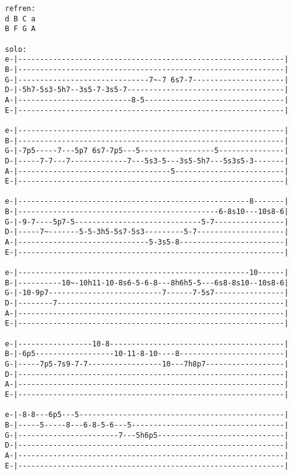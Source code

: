 \begin{verbatim}
refren:
d B C a
B F G A

solo:
e-|-------------------------------------------------------------|
B-|-------------------------------------------------------------|
G-|------------------------------7~-7 6s7-7---------------------|
D-|-5h7-5s3-5h7--3s5-7-3s5-7------------------------------------|
A-|--------------------------8-5--------------------------------|
E-|-------------------------------------------------------------|

e-|-------------------------------------------------------------|
B-|-------------------------------------------------------------|
G-|-7p5-----7---5p7 6s7-7p5---5-----------------5---------------|
D-|-----7-7---7-------------7---5s3-5---3s5-5h7---5s3s5-3-------|
A-|-----------------------------------5-------------------------|
E-|-------------------------------------------------------------|

e-|-----------------------------------------------------8-------|
B-|----------------------------------------------6-8s10---10s8-6|
G-|-9-7----5p7-5-----------------------------5-7----------------|
D-|-----7~-------5-5-3h5-5s7-5s3---------5-7--------------------|
A-|------------------------------5-3s5-8------------------------|
E-|-------------------------------------------------------------|

e-|-----------------------------------------------------10------|
B-|----------10~-10h11-10-8s6-5-6-8---8h6h5-5---6s8-8s10--10s8-6|
G-|-10-9p7--------------------------7------7-5s7----------------|
D-|--------7----------------------------------------------------|
A-|-------------------------------------------------------------|
E-|-------------------------------------------------------------|

e-|-----------------10-8----------------------------------------|
B-|-6p5------------------10-11-8-10----8------------------------|
G-|-----7p5-7s9-7-7-----------------10---7h8p7------------------|
D-|-------------------------------------------------------------|
A-|-------------------------------------------------------------|
E-|-------------------------------------------------------------|

e-|-8-8---6p5---5-----------------------------------------------|
B-|-----5-----8---6-8-5-6---5-----------------------------------|
G-|-----------------------7---5h6p5-----------------------------|
D-|-------------------------------------------------------------|
A-|-------------------------------------------------------------|
E-|-------------------------------------------------------------|


\end{verbatim}
